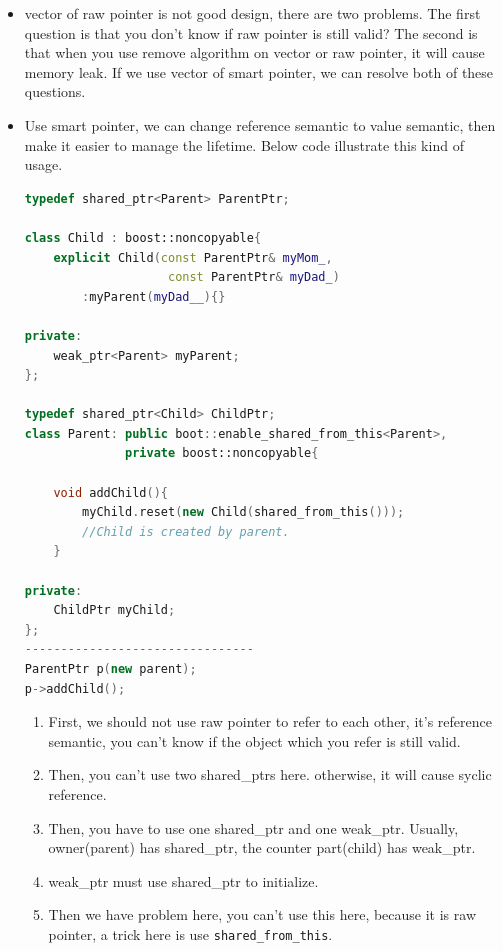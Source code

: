 \documentclass[a4paper,11pt,twoside]{book}
\begin{document}
\begin{itemize}
	\item vector of raw pointer is not good design, there are two problems. The first question is that you don't know if raw pointer is still valid? The second is that when you use remove algorithm on vector or raw pointer, it will cause memory leak. If we use vector of smart pointer, we can resolve both of these questions. 
	
	\item Use smart pointer, we can change reference semantic to value semantic, then make it easier to manage the lifetime. Below code illustrate this kind of usage. 
	
\begin{lstlisting}[frame=single, language=c++, mathescape=true]
typedef shared_ptr<Parent> ParentPtr;

class Child : boost::noncopyable{
	explicit Child(const ParentPtr& myMom_,
					const ParentPtr& myDad_)
		:myParent(myDad__){}
		
private:
	weak_ptr<Parent> myParent;
}; 

typedef shared_ptr<Child> ChildPtr;
class Parent: public boot::enable_shared_from_this<Parent>,
              private boost::noncopyable{
  
  	void addChild(){
  		myChild.reset(new Child(shared_from_this()));
  		//Child is created by parent.
  	}
		
private:
	ChildPtr myChild;
};
--------------------------------
ParentPtr p(new parent);
p->addChild();
\end{lstlisting}
\begin{enumerate}
	\item First, we should not use raw pointer to refer to each other, it's reference semantic, you can't know if the object which you refer is still valid.
	
	\item Then, you can't use two shared\_ptrs here. otherwise, it will cause syclic reference.
	
	\item Then, you have to use one shared\_ptr and one weak\_ptr. Usually, owner(parent) has shared\_ptr, the counter part(child) has weak\_ptr. 
	
	\item weak\_ptr must use shared\_ptr to initialize. 
	
	\item Then we have problem here, you can't use this here, because it is raw pointer, a trick here is use \texttt{shared\_from\_this}.
\end{enumerate}

	
\end{itemize}
\end{document}
